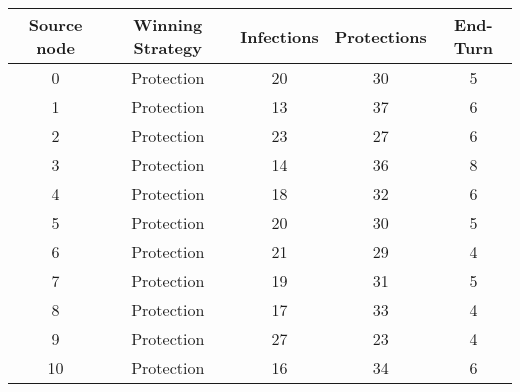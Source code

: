 \documentclass[results.tex]{subfiles}
\begin{document}
    \begin{center}
        \begin{tabular}{| c || c | c | c | c |}
            \hline
            {\bfseries Source node} & {\bfseries Winning Strategy} & {\bfseries Infections} & {\bfseries Protections}
            & {\bfseries End-Turn}
            \\  %
            \hline\hline
            0                       & Protection                   & 20                     & 30                      & 5                    \\
            \hline
            1                       & Protection                   & 13                     & 37                      & 6                    \\
            \hline
            2                       & Protection                   & 23                     & 27                      & 6                    \\
            \hline
            3                       & Protection                   & 14                     & 36                      & 8                    \\
            \hline
            4                       & Protection                   & 18                     & 32                      & 6                    \\
            \hline
            5                       & Protection                   & 20                     & 30                      & 5                    \\
            \hline
            6                       & Protection                   & 21                     & 29                      & 4                    \\
            \hline
            7                       & Protection                   & 19                     & 31                      & 5                    \\
            \hline
            8                       & Protection                   & 17                     & 33                      & 4                    \\
            \hline
            9                       & Protection                   & 27                     & 23                      & 4                    \\
            \hline
            10                      & Protection                   & 16                     & 34                      & 6                    \\

\end{tabular}
\end{center}
\end{document}
